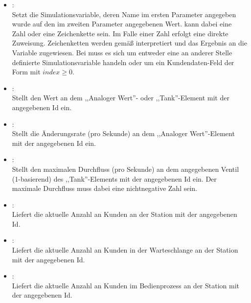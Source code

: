 \begin{itemize}

\item
{}:\\
Setzt die Simulationsvariable, deren Name im ersten Parameter angegeben wurde auf den im zweiten Parameter angegebenen Wert.
 kann dabei eine Zahl oder eine Zeichenkette sein. Im Falle einer Zahl erfolgt eine direkte Zuweisung.
Zeichenketten werden gemäß  interpretiert und das Ergebnis an die Variable zugewiesen. Bei 
muss es sich um entweder eine an anderer Stelle definierte Simulationsvariable handeln oder um ein Kundendaten-Feld der Form
 mit $index\ge0$. 
  
\item
{}:\\
Stellt den Wert an dem ,,Analoger Wert''- oder ,,Tank''-Element mit der angegebenen Id ein.
  
\item
{}:\\
Stellt die Änderungsrate (pro Sekunde) an dem ,,Analoger Wert''-Element mit der angegebenen Id ein.
  
\item
{}:\\
Stellt den maximalen Durchfluss (pro Sekunde) an dem angegebenen Ventil (1-basierend) des ,,Tank''-Elements mit der angegebenen Id ein.
Der maximale Durchfluss muss dabei eine nichtnegative Zahl sein. 
  
\item
{}:\\
Liefert die aktuelle Anzahl an Kunden an der Station mit der angegebenen Id.
  
\item
{}:\\
Liefert die aktuelle Anzahl an Kunden in der Warteschlange an der Station mit der angegebenen Id.

\item
{}:\\
Liefert die aktuelle Anzahl an Kunden im Bedienprozess an der Station mit der angegebenen Id.


\end{itemize}
